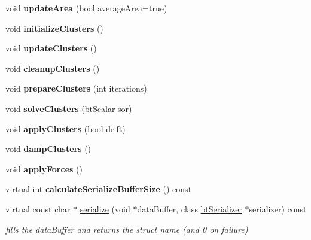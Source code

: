 \begin{DoxyCompactItemize}
\item 
\hypertarget{classbt_soft_body_a4b8bec593f187ae54ca4a2cd1bab7863}{void {\bfseries update\+Area} (bool average\+Area=true)}\label{classbt_soft_body_a4b8bec593f187ae54ca4a2cd1bab7863}

\item 
\hypertarget{classbt_soft_body_ac6bcd9853756ab196ea18c831a04a8b7}{void {\bfseries initialize\+Clusters} ()}\label{classbt_soft_body_ac6bcd9853756ab196ea18c831a04a8b7}

\item 
\hypertarget{classbt_soft_body_a0fbc8cbbe127ff3d1ed9467e709a8181}{void {\bfseries update\+Clusters} ()}\label{classbt_soft_body_a0fbc8cbbe127ff3d1ed9467e709a8181}

\item 
\hypertarget{classbt_soft_body_a6b9b7057950305e0046f173fe27698da}{void {\bfseries cleanup\+Clusters} ()}\label{classbt_soft_body_a6b9b7057950305e0046f173fe27698da}

\item 
\hypertarget{classbt_soft_body_a4ee4c96c4821c31be91a3edeab2365fd}{void {\bfseries prepare\+Clusters} (int iterations)}\label{classbt_soft_body_a4ee4c96c4821c31be91a3edeab2365fd}

\item 
\hypertarget{classbt_soft_body_aa577be31d76bdc85298424d88790e6d5}{void {\bfseries solve\+Clusters} (bt\+Scalar sor)}\label{classbt_soft_body_aa577be31d76bdc85298424d88790e6d5}

\item 
\hypertarget{classbt_soft_body_a47c6e2066250a6c2564abadf3fc72029}{void {\bfseries apply\+Clusters} (bool drift)}\label{classbt_soft_body_a47c6e2066250a6c2564abadf3fc72029}

\item 
\hypertarget{classbt_soft_body_a83d01c7ffe27a02f42bcb9d191c4a327}{void {\bfseries damp\+Clusters} ()}\label{classbt_soft_body_a83d01c7ffe27a02f42bcb9d191c4a327}

\item 
\hypertarget{classbt_soft_body_ab60ff6213c14fe1f6c7a354503dadc80}{void {\bfseries apply\+Forces} ()}\label{classbt_soft_body_ab60ff6213c14fe1f6c7a354503dadc80}

\item 
\hypertarget{classbt_soft_body_a31284537a34144a1e21f8a5d84312eb9}{virtual int {\bfseries calculate\+Serialize\+Buffer\+Size} () const }\label{classbt_soft_body_a31284537a34144a1e21f8a5d84312eb9}

\item 
\hypertarget{classbt_soft_body_ac24b1fbdcc3ed3d26b3dae6380303c77}{virtual const char $\ast$ \hyperlink{classbt_soft_body_ac24b1fbdcc3ed3d26b3dae6380303c77}{serialize} (void $\ast$data\+Buffer, class \hyperlink{classbt_serializer}{bt\+Serializer} $\ast$serializer) const }\label{classbt_soft_body_ac24b1fbdcc3ed3d26b3dae6380303c77}

\begin{DoxyCompactList}\small\item\em fills the data\+Buffer and returns the struct name (and 0 on failure) \end{DoxyCompactList}\end{DoxyCompactItemize}
